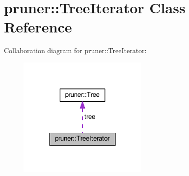 \hypertarget{classpruner_1_1TreeIterator}{}\section{pruner\+:\+:Tree\+Iterator Class Reference}
\label{classpruner_1_1TreeIterator}


Collaboration diagram for pruner\+:\+:Tree\+Iterator\+:\nopagebreak
\begin{figure}[H]
\begin{center}
\leavevmode
\includegraphics[width=180pt]{classpruner_1_1TreeIterator__coll__graph}
\end{center}
\end{figure}

